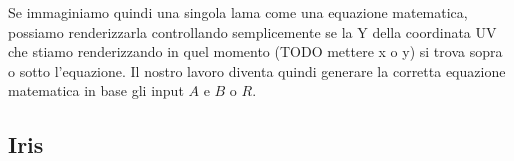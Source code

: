 \documentclass[main.tex]{subfiles}
\begin{document}
Se immaginiamo quindi una singola lama come una equazione matematica, possiamo renderizzarla controllando semplicemente se la Y della coordinata UV che stiamo renderizzando in quel momento (TODO mettere x o y) si trova sopra o sotto l'equazione. Il nostro lavoro diventa quindi generare la corretta equazione matematica in base gli input $A$ e $B$ o $R$.





\subsection{Iris}\label{subsec:5_Iris}
\end{document}
